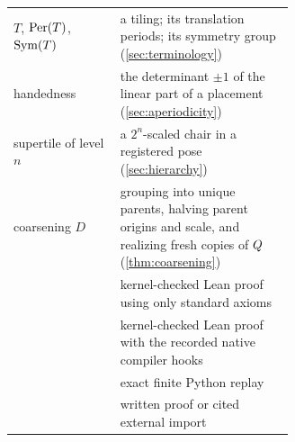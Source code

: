 \begin{table}[ht]
\begin{tabular}{l L{0.62\linewidth}}
    $T$, $\operatorname{Per}(T)$, $\operatorname{Sym}(T)$ & a tiling; its translation periods; its symmetry group (\cref{sec:terminology}) \\
    handedness & the determinant $\pm1$ of the linear part of a placement (\cref{sec:aperiodicity}) \\
    supertile of level $n$ & a $2^n$-scaled chair in a registered pose (\cref{sec:hierarchy}) \\
    coarsening $D$ & grouping into unique parents, halving parent origins and scale, and realizing fresh copies of $Q$ (\cref{thm:coarsening}) \\
     & kernel-checked Lean proof using only standard axioms \\
     & kernel-checked Lean proof with the recorded native compiler hooks \\
     & exact finite Python replay \\
     & written proof or cited external import \\
    \bottomrule
  \end{tabular}
\end{table}
